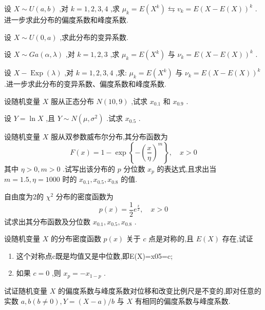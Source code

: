 \begin{xiti}
\item 设 $ X \sim U(a, b) $ ,对 $ k=1,2,3,4 $ ,求 $ \mu_{k}=E\left(X^{k}\right) \leftrightarrows v_{k}=E(X-E(X))^{k} $ .进一步求此分布的偏度系数和峰度系数.
\item 设 $ X \sim U(0, a) $ ,求此分布的变异系数.
\item 设 $ X \sim G a(\alpha, \lambda) $ ,对 $ k=1,2,3 $ ,求 $ \mu_{k}=E\left(X^{k}\right) $ 与 $ \nu_{k}=E(X-E(X))^{k} $ .
\item 设 $ X-\operatorname{Exp}(\lambda) $ ,对 $ k=1,2,3,4 $ ,求: $ \mu_{k}=E\left(X^{k}\right) $ 与 $ \nu_{k}=E(X-E(X))^{k} $ .进一步求此分布的变异系数、偏度系数和峰度系数.
\item 设随机变量 $ X $ 服从正态分布 $ N(10,9) $ ,试求 $ x_{0.1} $ 和 $ x_{0.9} $ .
\item 设 $ Y=\ln X $ ,且 $ Y \sim N\left(\mu, \sigma^{2}\right) $ .试求 $ x_{0.5} $ .
\item 设随机变量 $ X $ 服从双参数威布尔分布,其分布函数为
\[
F(x)=1-\exp \left\{-\left(\frac{x}{\eta}\right)^{m}\right\}, \quad x>0
\]
其中 $ \eta>0, m>0 $ .试写出该分布的 $ p $ 分位数 $ x_{p} $ 的表达式,且求出当 $ m=1.5, \eta=1000 $ 时的 $ x_{0.1}, x_{0.5}, x_{0.8} $ 的值.
\item 自由度为2的 $ \chi^{2} $ 分布的密度函数为
\[
p(x)=\frac{1}{2} e^{\frac{x}{2}}, \quad x>0
\]
试求出其分布函数及分位数 $ x_{0.1}, x_{0.5}, x_{0.8} $ .
\item 设随机变量 $ X $ 的分布密度函数 $ p(x) $ 关于 $ c $ 点是对称的,且 $ E(X) $ 存在,试证
\begin{enumerate}
	\item 这个对称点c既是均值又是中位数,即E(X)=x05=c;
	\item 如果 $ c=0 $ ,则 $ x_{p}=-x_{1-p} $ .
\end{enumerate}
\item 试证随机变量 $ X $ 的偏度系数与峰度系数对位移和改变比例尺是不变的,即对任意的实数 $ a, b(b \neq 0), Y=(X-a) / b $ 与 $ X $ 有相同的偏度系数与峰度系数.
\end{xiti}

\printindex